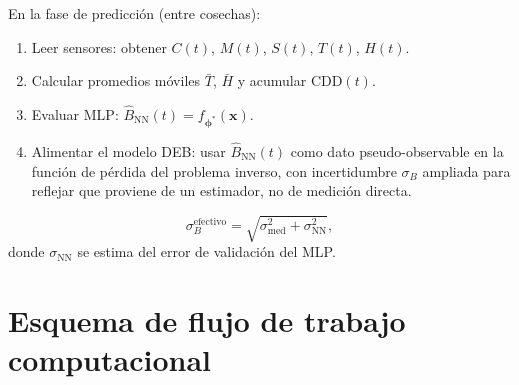 En la fase de predicción (entre cosechas):
\begin{enumerate}
    \item Leer sensores: obtener $C(t)$, $M(t)$, $S(t)$, $T(t)$, $H(t)$.
    \item Calcular promedios móviles $\bar{T}$, $\bar{H}$ y acumular $\mathrm{CDD}(t)$.
    \item Evaluar MLP: $\hat{B}_{\text{NN}}(t) = f_{\boldsymbol{\phi}^{*}}(\mathbf{x})$.
    \item Alimentar el modelo DEB: usar $\hat{B}_{\text{NN}}(t)$ como dato pseudo-observable en la función de pérdida del problema inverso, con incertidumbre $\sigma_B$ ampliada para reflejar que proviene de un estimador, no de medición directa.
\end{enumerate}

\begin{equation}
\sigma_B^{\text{efectivo}} = \sqrt{ \sigma_{\text{med}}^2 + \sigma_{\text{NN}}^2 },
\end{equation}
donde $\sigma_{\text{NN}}$ se estima del error de validación del MLP.

\section{Esquema de flujo de trabajo computacional}

